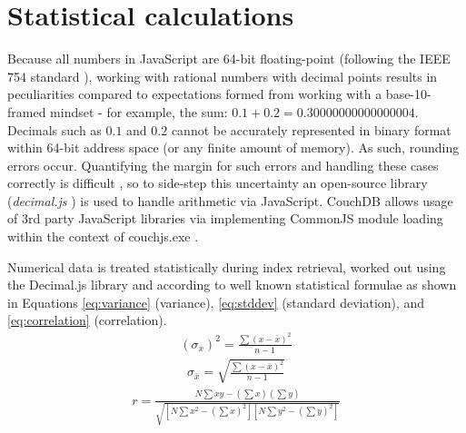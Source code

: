 \section{Statistical calculations}
Because all numbers in JavaScript are 64-bit floating-point (following the IEEE 754 standard \cite{floatingPoint}), working with rational numbers with decimal points results in peculiarities compared to expectations formed from working with a base-10-framed mindset - for example, the sum: $0.1 + 0.2 = 0.30000000000000004$. Decimals such as $0.1$ and $0.2$ cannot be accurately represented in binary format within 64-bit address space (or any finite amount of memory). As such, rounding errors occur. Quantifying the margin for such errors and handling these cases correctly is difficult \cite{Goldberg1991}, so to side-step this uncertainty an open-source library (\textit{decimal.js} \cite{decimaljs}) is used to handle arithmetic via JavaScript. CouchDB allows usage of 3rd party JavaScript libraries via implementing CommonJS module loading within the context of couchjs.exe \cite{commonJsMapFn}.

Numerical data is treated statistically during index retrieval, worked out using the Decimal.js library and according to well known statistical formulae as shown in Equations \ref{eq:variance} (variance), \ref{eq:stddev} (standard deviation), and \ref{eq:correlation} (correlation).
\begin{align}
  (\sigma_{\overline{x}})^{2} = \frac{\sum{(x-\bar{x})^2}}{n-1}\label{eq:variance}
\end{align}
\begin{align}
  \sigma_{\overline{x}} = \sqrt{\frac{\sum{(x-\bar{x})^2}}{n-1}}\label{eq:stddev}
\end{align}
\begin{align}
  r = \frac{N\sum{xy} - (\sum{x})(\sum{y})}{\sqrt{[N\sum{x^2} - (\sum{x})^2][N\sum{y^2} - (\sum{y})^2]}} \label{eq:correlation}
\end{align}